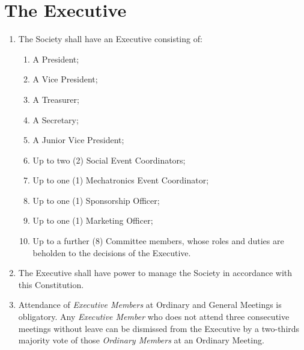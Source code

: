 \documentclass[11pt]{article}
\begin{document}
\section{The Executive}
\begin{enumerate}[\thesection .1]
    \item The Society shall have an Executive consisting of:
    \begin{enumerate}
        \item A President;
        \item A Vice President;
        \item A Treasurer;
        \item A Secretary;
        \item A Junior Vice President;
        \item Up to two (2) Social Event Coordinators;
        \item Up to one (1) Mechatronics Event Coordinator;
        \item Up to one (1) Sponsorship Officer;
        \item Up to one (1) Marketing Officer;
        \item Up to a further (8) Committee members, whose roles and duties are beholden to the decisions of the Executive.
    \end{enumerate}
    \item The Executive shall have power to manage the Society in accordance with this Constitution.
    \item Attendance of \textit{Executive Members} at Ordinary and General Meetings is obligatory. Any \textit{Executive Member} who does not attend three consecutive meetings without leave can be dismissed from the Executive by a two-thirds majority vote of those \textit{Ordinary Members} at an Ordinary Meeting.
\end{enumerate}
\end{document}
